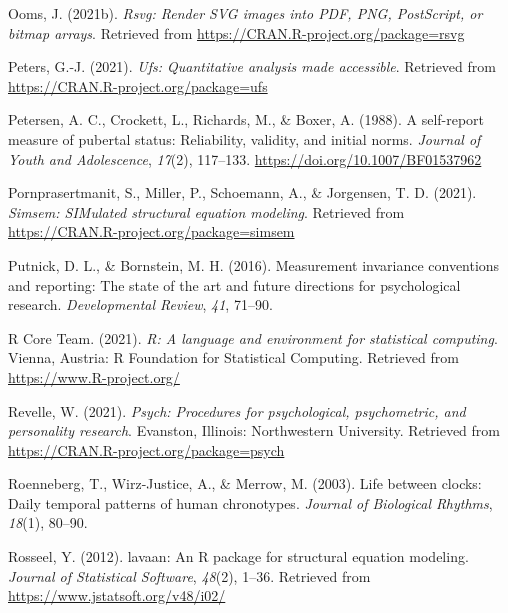 \documentclass[
  english,
  man]{apa6}
\newlength{\cslhangindent}
\newlength{\cslentryspacingunit} %
\newenvironment{CSLReferences}[2] %
 {%
  \setlength{\parindent}{0pt}
  \ifodd #1
  \let\oldpar\par
  \def\par{\hangindent=\cslhangindent\oldpar}
  \fi
  \setlength{\parskip}{#2\cslentryspacingunit}
 }%
 {}
\begin{document}
\begin{CSLReferences}{1}{0}
\leavevmode{}%
Ooms, J. (2021b). \emph{Rsvg: Render SVG images into PDF, PNG, PostScript, or bitmap arrays}. Retrieved from \url{https://CRAN.R-project.org/package=rsvg}

\leavevmode{}%
Peters, G.-J. (2021). \emph{Ufs: Quantitative analysis made accessible}. Retrieved from \url{https://CRAN.R-project.org/package=ufs}

\leavevmode{}%
Petersen, A. C., Crockett, L., Richards, M., \& Boxer, A. (1988). A self-report measure of pubertal status: Reliability, validity, and initial norms. \emph{Journal of Youth and Adolescence}, \emph{17}(2), 117--133. \url{https://doi.org/10.1007/BF01537962}

\leavevmode{}%
Pornprasertmanit, S., Miller, P., Schoemann, A., \& Jorgensen, T. D. (2021). \emph{Simsem: SIMulated structural equation modeling}. Retrieved from \url{https://CRAN.R-project.org/package=simsem}

\leavevmode{}%
Putnick, D. L., \& Bornstein, M. H. (2016). Measurement invariance conventions and reporting: The state of the art and future directions for psychological research. \emph{Developmental Review}, \emph{41}, 71--90.

\leavevmode{}%
R Core Team. (2021). \emph{R: A language and environment for statistical computing}. Vienna, Austria: R Foundation for Statistical Computing. Retrieved from \url{https://www.R-project.org/}

\leavevmode{}%
Revelle, W. (2021). \emph{Psych: Procedures for psychological, psychometric, and personality research}. Evanston, Illinois: Northwestern University. Retrieved from \url{https://CRAN.R-project.org/package=psych}

\leavevmode{}%
Roenneberg, T., Wirz-Justice, A., \& Merrow, M. (2003). Life between clocks: Daily temporal patterns of human chronotypes. \emph{Journal of Biological Rhythms}, \emph{18}(1), 80--90.

\leavevmode{}%
Rosseel, Y. (2012). {lavaan}: An {R} package for structural equation modeling. \emph{Journal of Statistical Software}, \emph{48}(2), 1--36. Retrieved from \url{https://www.jstatsoft.org/v48/i02/}


\end{CSLReferences}
\end{document}
